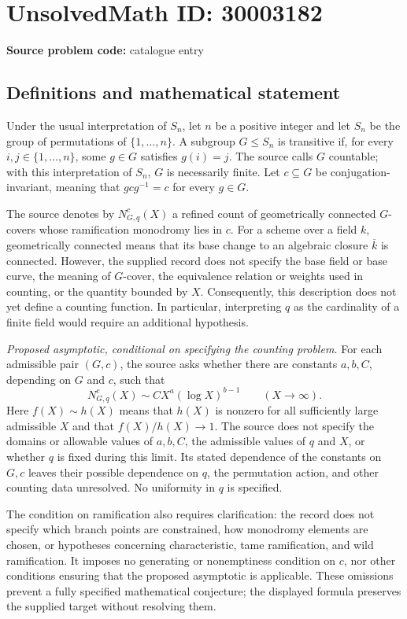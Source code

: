 \documentclass[11pt]{article}
\begin{document}
\section*{UnsolvedMath ID: 30003182}
\textbf{Source problem code:} catalogue entry
\subsection{Definitions and mathematical statement}
Under the usual interpretation of \(S_n\), let \(n\) be a positive integer and let \(S_n\) be the group of permutations of \(\{1,\ldots,n\}\). A subgroup \(G\leq S_n\) is transitive if, for every \(i,j\in\{1,\ldots,n\}\), some \(g\in G\) satisfies \(g(i)=j\). The source calls \(G\) countable; with this interpretation of \(S_n\), \(G\) is necessarily finite. Let \(c\subseteq G\) be conjugation-invariant, meaning that \(gcg^{-1}=c\) for every \(g\in G\).

The source denotes by \(N^c_{G,q}(X)\) a refined count of geometrically connected \(G\)-covers whose ramification monodromy lies in \(c\). For a scheme over a field \(k\), geometrically connected means that its base change to an algebraic closure \(\overline{k}\) is connected. However, the supplied record does not specify the base field or base curve, the meaning of \(G\)-cover, the equivalence relation or weights used in counting, or the quantity bounded by \(X\). Consequently, this description does not yet define a counting function. In particular, interpreting \(q\) as the cardinality of a finite field would require an additional hypothesis.

\emph{Proposed asymptotic, conditional on specifying the counting problem.} For each admissible pair \((G,c)\), the source asks whether there are constants \(a,b,C\), depending on \(G\) and \(c\), such that
\[
N^c_{G,q}(X)\sim C X^a(\log X)^{b-1}
\qquad (X\longrightarrow\infty).
\]
Here \(f(X)\sim h(X)\) means that \(h(X)\) is nonzero for all sufficiently large admissible \(X\) and that \(f(X)/h(X)\to1\). The source does not specify the domains or allowable values of \(a,b,C\), the admissible values of \(q\) and \(X\), or whether \(q\) is fixed during this limit. Its stated dependence of the constants on \(G,c\) leaves their possible dependence on \(q\), the permutation action, and other counting data unresolved. No uniformity in \(q\) is specified.

The condition on ramification also requires clarification: the record does not specify which branch points are constrained, how monodromy elements are chosen, or hypotheses concerning characteristic, tame ramification, and wild ramification. It imposes no generating or nonemptiness condition on \(c\), nor other conditions ensuring that the proposed asymptotic is applicable. These omissions prevent a fully specified mathematical conjecture; the displayed formula preserves the supplied target without resolving them.
\end{document}
